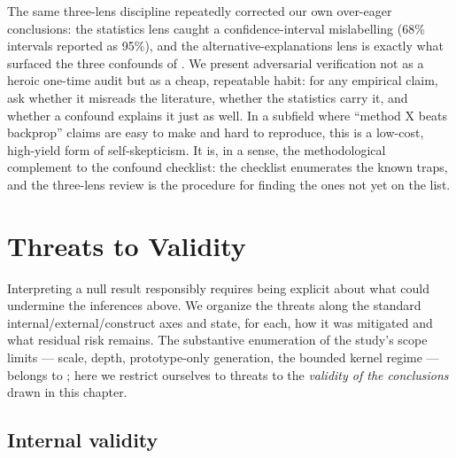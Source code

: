 The same three-lens discipline repeatedly corrected our own over-eager conclusions: the statistics
lens caught a confidence-interval mislabelling (68\% intervals reported as 95\%), and the
alternative-explanations lens is exactly what surfaced the three confounds of
. We present adversarial verification not as a heroic one-time audit but as
a cheap, repeatable habit: for any empirical claim, ask whether it misreads the literature, whether
the statistics carry it, and whether a confound explains it just as well. In a subfield where
``method X beats backprop'' claims are easy to make and hard to reproduce, this is a low-cost,
high-yield form of self-skepticism. It is, in a sense, the methodological complement to the confound
checklist: the checklist enumerates the known traps, and the three-lens review is the procedure for
finding the ones not yet on the list.

\section{Threats to Validity}\label{sec:disc-threats}

Interpreting a null result responsibly requires being explicit about what could undermine the
inferences above. We organize the threats along the standard internal/external/construct axes and
state, for each, how it was mitigated and what residual risk remains. The substantive enumeration of
the study's scope limits --- scale, depth, prototype-only generation, the bounded kernel regime ---
belongs to ; here we restrict ourselves to threats to the \emph{validity of the
conclusions} drawn in this chapter.

\subsection{Internal validity}

